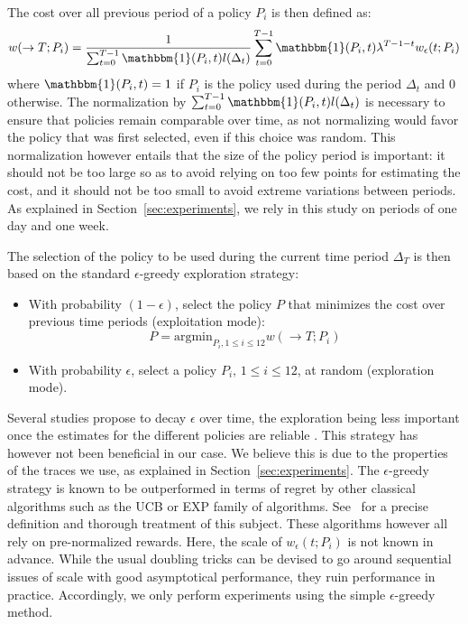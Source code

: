 \documentclass[sigconf,anonymous]{acmart}
\begin{document}

The cost over all previous period of a policy $P_i$ is then defined as:
%
\begin{equation} \label{eq:tot-cost-greedy} w(\rightarrow T;P_i) =
\frac{1}{\sum_{t=0}^{T-1} \mathbbm{1}(P_i,t) l(\Delta_t)} \sum_{t=0}^{T-1}
\mathbbm{1}(P_i,t) \lambda^{T-1-t} w_{\epsilon}(t;P_i) \end{equation}
%
where $\mathbbm{1}(P_i,t) = 1$ if $P_i$ is the policy used during the period
$\Delta_t$ and $0$ otherwise. The normalization by $\sum_{t=0}^{T-1}
\mathbbm{1}(P_i,t) l(\Delta_t)$ is necessary to ensure that policies
remain comparable over time, as not normalizing would favor the policy that was
first selected, even if this choice was random. This normalization however
entails that the size of the policy period is important: it should not be too
large so as to avoid relying on too few points for estimating the cost, and it
should not be too small to avoid extreme variations between periods. As
explained in Section~\ref{sec:experiments}, we rely in this study on periods of
one day and one week.

The selection of the policy to be used during the current time period
$\Delta_T$ is then based on the standard $\epsilon$-greedy exploration
strategy:

%
\begin{itemize}
\item With probability $(1-\epsilon)$, select the policy $P$ that minimizes the cost over previous time periods (exploitation mode):
%
\begin{equation}
\label{eq:select-greedy}
P = \mbox{argmin}_{P_i, 1 \le i \le 12} w(\rightarrow T;P_i)
\end{equation}
%
\item With probability $\epsilon$, select a policy $P_i, \, 1 \le i \le 12$, at random (exploration mode).
\end{itemize}

Several studies propose to decay $\epsilon$ over time, the exploration being
less important once the estimates for the different policies are reliable
\cite{Tokic:2010}. This strategy has however not been beneficial in our case.
We believe this is due to the properties of the traces we use, as explained in
Section~\ref{sec:experiments}. The $\epsilon$-greedy strategy is known to be
outperformed in terms of regret by other classical algorithms such as the UCB
or EXP family of algorithms. See~\cite{bubnow} for a precise definition and
thorough treatment of this subject. These algorithms however all rely on
pre-normalized rewards. Here, the scale of $w_{\epsilon}(t;P_i)$ is not known
in advance. While the usual doubling tricks can be devised to go around
sequential issues of scale with good asymptotical performance, they ruin
performance in practice. Accordingly, we only perform experiments using the
simple $\epsilon$-greedy method.
\end{document}
